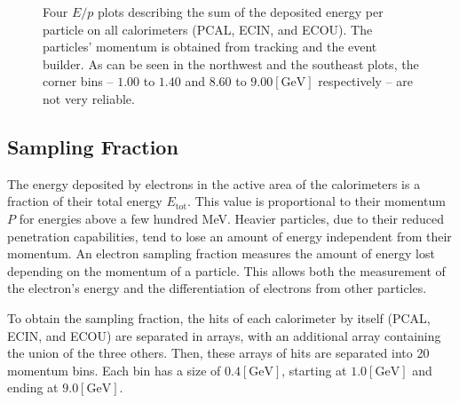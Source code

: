     \begin{figure}[b!]
        \centering{}
        \caption[Calorimeters $E/p$ plots]{Four $E/p$ plots describing the sum of the deposited energy per particle on all calorimeters (PCAL, ECIN, and ECOU). The particles' momentum is obtained from tracking and the event builder. As can be seen in the northwest and the southeast plots, the corner bins -- $1.00$ to $1.40$ and $8.60$ to $9.00 [\text{GeV}]$ respectively -- are not very reliable.}
        \label{fig::sf_1d}
    \end{figure}

\subsection{Sampling Fraction} \label{ssec::sampling_fraction}
    The energy deposited by electrons in the active area of the calorimeters is a fraction of their total energy $E_\text{tot}$.
    This value is proportional to their momentum $P$ for energies above a few hundred MeV.
    Heavier particles, due to their reduced penetration capabilities, tend to lose an amount of energy independent from their momentum.
    An electron sampling fraction measures the amount of energy lost depending on the momentum of a particle.
    This allows both the measurement of the electron's energy and the differentiation of electrons from other particles. %

    To obtain the sampling fraction, the hits of each calorimeter by itself (PCAL, ECIN, and ECOU) are separated in arrays, with an additional array containing the union of the three others.
    Then, these arrays of hits are separated into 20 momentum bins.
    Each bin has a size of $0.4 [\text{GeV}]$, starting at $1.0 [\text{GeV}]$ and ending at $9.0 [\text{GeV}]$.

